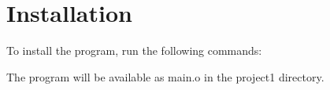 \chapter{Installation}
\hypertarget{md_INSTALL}{}\label{md_INSTALL}
\label{md_INSTALL_autotoc_md7}%
%
 To install the program, run the following commands\+:


\begin{DoxyCode}{0}

\end{DoxyCode}


The program will be available as {\ttfamily main.\+o} in the {\ttfamily project1} directory. 